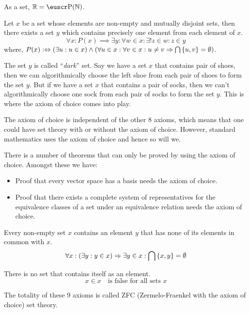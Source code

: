 \begin{remark}
	As a set, \(\R = \powerset(\N)\).
\end{remark}

\begin{axiom}\label{axiom:C8}
	Let \(x\) be a set whose elements are non-empty and mutually disjoint sets, then there exists a set \(y\) which contains precisely one element from each element of \(x\).
	\begin{equation}
		\forall x: P(x) \implies \exists y: \forall w \in x: \exists! z \in w: z \in y
	\end{equation}
	where, \(P(x) :\Leftrightarrow (\exists u: u \in x) \land \qty(\forall u \in x: \forall v \in x: u \neq v \Rightarrow \bigcap \qty{u, v} = \emptyset)\).
\end{axiom}
The set \(y\) is called ``\emph{dark}'' set. Say we have a set \(x\) that contains pair of shoes, then we can algorithmically choose the left shoe from each pair of shoes to form the set \(y\). But if we have a set \(x\) that contains a pair of socks, then we can't algorithmically choose one sock from each pair of socks to form the set \(y\). This is where the axiom of choice comes into play.

The axiom of choice is independent of the other 8 axioms, which means that one could have set theory with or without the axiom of choice. However, standard mathematics uses the axiom of choice and hence so will we.

There is a number of theorems that can only be proved by using the axiom of choice. Amongst these we have:
\begin{itemize}
	\item Proof that every vector space has a basis needs the axiom of choice.
	\item Proof that there exists a complete system of representatives for the equivalence classes of a set under an equivalence relation needs the axiom of choice.
\end{itemize}

\begin{axiom}\label{axiom:F9}
	Every non-empty set \(x\) contains an element \(y\) that has none of its elements in common with \(x\).
	\begin{equation}
		\forall x: (\exists y: y \in x) \Rightarrow \exists y \in x: \bigcap \qty{x, y} = \emptyset
	\end{equation}
\end{axiom}

\begin{corollary}
	There is no set that contains itself as an element.
	\begin{equation}
		x \in x \quad \text{is false for all sets \(x\)}
	\end{equation}
\end{corollary}
The totality of these 9 axioms is called ZFC (Zermelo-Fraenkel with the axiom of choice) set theory.
